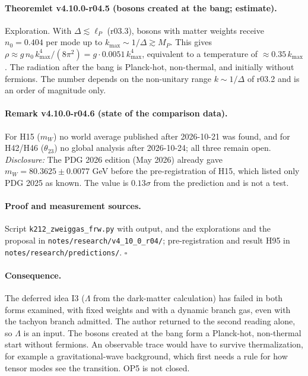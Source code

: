 \paragraph{Theoremlet v4.10.0-r04.5 (bosons created at the bang; estimate).}
Exploration.  With \(\Delta\lesssim\ell_P\) (r03.3), bosons with matter weights receive \(n_0=0.404\) per mode up to \(k_{\max}\sim1/\Delta\gtrsim M_P\).  This
gives \(\rho\approx g\,n_0\,k_{\max}^4/(8\pi^2)=g\cdot0.0051\,k_{\max}^4\), equivalent to a temperature of \(\approx0.35\,k_{\max}\).  The radiation after the bang is
Planck-hot, non-thermal, and initially without fermions.  The number depends on the non-unitary range \(k\sim1/\Delta\) of r03.2 and is an order of
magnitude only.

\paragraph{Remark v4.10.0-r04.6 (state of the comparison data).}
For H15 (\(m_W\)) no world average published after 2026-10-21 was found, and for H42/H46 (\(\theta_{23}\)) no global analysis after 2026-10-24; all three
remain open.  \emph{Disclosure:} The PDG 2026 edition (May 2026) already gave \(m_W=80.3625\pm0.0077\) GeV before the pre-registration of H15, which
listed only PDG 2025 as known.  The value is \(0.13\sigma\) from the prediction and is not a test.

\paragraph{Proof and measurement sources.}
Script \texttt{k212\_\allowbreak zweiggas\_\allowbreak frw.py} with output, and the explorations and the proposal in
\texttt{notes/\allowbreak research/\allowbreak v4\_10\_0\_r04/}; pre-registration and result H95 in \texttt{notes/\allowbreak research/\allowbreak predictions/}.  \(\square\)

\paragraph{Consequence.}
The deferred idea I3 (\(\Lambda\) from the dark-matter calculation) has failed in both forms examined, with fixed weights and with a dynamic branch gas,
even with the tachyon branch admitted.  The author returned to the second reading alone, so \(\Lambda\) is an input.  The bosons created at the bang
form a Planck-hot, non-thermal start without fermions.  An observable trace would have to survive thermalization, for example a gravitational-wave
background, which first needs a rule for how tensor modes see the transition.  OP5 is not closed.

